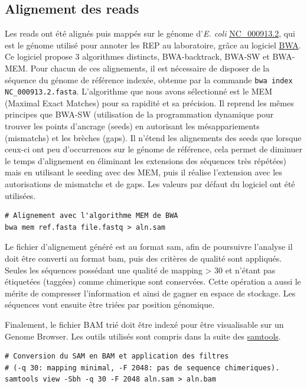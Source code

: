 \documentclass[12pt,a4paper]{report}
\begin{document}
\begin{onehalfspace}
\section*{Alignement des reads}
Les reads ont été alignés puis mappés sur le génome d'\textit{E. coli} \href{http://www.ncbi.nlm.nih.gov/nuccore/NC_000913.2}{NC\_000913.2}, qui est le génome utilisé pour annoter les REP au laboratoire, grâce au logiciel \href{http://bio-bwa.sourceforge.net/}{BWA}.  Ce logiciel propose 3 algorithmes distincts, BWA-backtrack, BWA-SW et BWA-MEM. Pour chacun de ces alignements, il est nécessaire de disposer de la séquence du génome de référence indexée, obtenue par la commande \texttt{bwa index NC\_000913.2.fasta}. 
L'algorithme que nous avons sélectionné est le MEM (Maximal Exact Matches) pour sa rapidité et sa précision. Il reprend les mêmes principes que BWA-SW (utilisation de la programmation dynamique pour trouver les points d'ancrage (seeds) en autorisant les mésappariements (mismatchs) et les brèches (gaps). Il n'étend les alignements des seeds que lorsque ceux-ci ont peu d'occurrences sur le génome de référence, cela permet de diminuer le temps d'alignement en éliminant les extensions des séquences très répétées) mais en utilisant le seeding avec des MEM, puis il réalise l'extension avec les autorisations de mismatchs et de gaps. Les valeurs par défaut du logiciel ont été utilisées.
\begin{lstlisting}[frame=single]
# Alignement avec l'algorithme MEM de BWA
bwa mem ref.fasta file.fastq > aln.sam
\end{lstlisting}
Le fichier d'alignement généré est au format \gls{sam}, afin de poursuivre l'analyse il doit être converti au format \gls{bam}, puis des critères de qualité sont appliqués. Seules les séquences possédant une qualité de mapping > 30 et n'étant pas étiquetées (taggées) comme \gls{chimerique} sont conservées. Cette opération a aussi le mérite de compresser l'information et ainsi de gagner en espace de stockage. Les séquences vont ensuite être triées par position génomique.

Finalement, le fichier BAM trié doit être indexé pour être visualisable sur un Genome Browser. Les outils utilisés sont compris dans la suite des \href{http://samtools.sourceforge.net/samtools.shtml}{samtools}.
\begin{lstlisting}[frame=single]
# Conversion du SAM en BAM et application des filtres
# (-q 30: mapping minimal, -F 2048: pas de sequence chimeriques).
samtools view -Sbh -q 30 -F 2048 aln.sam > aln.bam


\end{lstlisting}
\end{onehalfspace}
\end{document}
